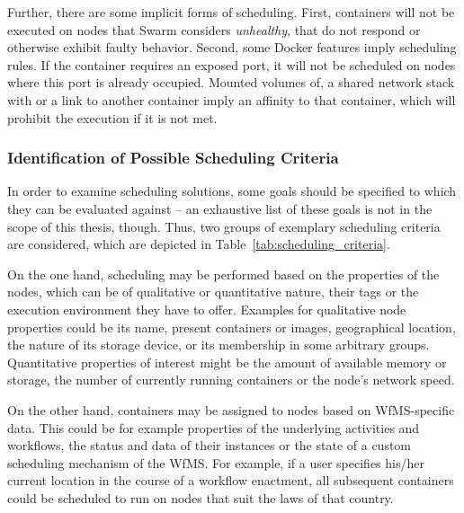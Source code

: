    Further, there are some implicit forms of scheduling. First, containers will not be executed on nodes that Swarm considers \emph{unhealthy}, \ie that do not respond or otherwise exhibit faulty behavior. Second, some Docker features imply scheduling rules. If the container requires an exposed port, it will not be scheduled on nodes where this port is already occupied. Mounted volumes of, a shared network stack with or a link to another container imply an affinity to that container, which will prohibit the execution if it is not met.

  \subsubsection{Identification of Possible Scheduling Criteria} %
  \label{ssub:identification_of_desired_scheduling_criteria}
    In order to examine scheduling solutions, some goals should be specified to which they can be evaluated against -- an exhaustive list of these goals is not in the scope of this thesis, though. Thus, two groups of exemplary scheduling criteria are considered, which are depicted in Table~\ref{tab:scheduling_criteria}.

    On the one hand, scheduling may be performed based on the properties of the nodes, which can be of qualitative or quantitative nature, their tags or the execution environment they have to offer. Examples for qualitative node properties could be its name, present containers or images, geographical location, the nature of its storage device, or its membership in some arbitrary groups. Quantitative properties of interest might be the amount of available memory or storage, the number of currently running containers or the node's network speed.

    On the other hand, containers may be assigned to nodes based on \ac{WfMS}-specific data. This could be for example properties of the underlying activities and workflows, the status and data of their instances or the state of a custom scheduling mechanism of the \ac{WfMS}. For example, if a user specifies his/her current location in the course of a workflow enactment, all subsequent containers could be scheduled to run on nodes that suit the laws of that country.

